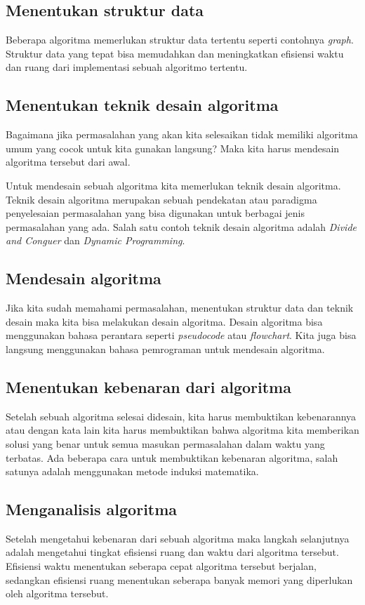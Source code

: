\subsection{Menentukan struktur data}
Beberapa algoritma memerlukan struktur data tertentu seperti contohnya \textit{graph}. Struktur data yang tepat bisa memudahkan dan meningkatkan efisiensi waktu dan ruang dari implementasi sebuah algoritmo tertentu. 

\subsection{Menentukan teknik desain algoritma}
Bagaimana jika permasalahan yang akan kita selesaikan tidak memiliki algoritma umum yang cocok untuk kita gunakan langsung? Maka kita harus mendesain algoritma tersebut dari awal. 

Untuk mendesain sebuah algoritma kita memerlukan teknik desain algoritma. Teknik desain algoritma merupakan sebuah pendekatan atau paradigma penyelesaian permasalahan yang bisa digunakan untuk berbagai jenis permasalahan yang ada. Salah satu contoh teknik desain algoritma adalah \textit{Divide and Conguer} dan \textit{Dynamic Programming}.

\subsection{Mendesain algoritma}
Jika kita sudah memahami permasalahan, menentukan struktur data dan teknik desain maka kita bisa melakukan desain algoritma. Desain algoritma bisa menggunakan bahasa perantara seperti \textit{pseudocode} atau \textit{flowchart}. Kita juga bisa langsung menggunakan bahasa pemrograman untuk mendesain algoritma. 

\subsection{Menentukan kebenaran dari algoritma}
Setelah sebuah algoritma selesai didesain, kita harus membuktikan kebenarannya atau dengan kata lain kita harus membuktikan bahwa algoritma kita memberikan solusi yang benar untuk semua masukan permasalahan dalam waktu yang terbatas. Ada beberapa cara untuk membuktikan kebenaran algoritma, salah satunya adalah menggunakan metode induksi matematika.

\subsection{Menganalisis algoritma}
Setelah mengetahui kebenaran dari sebuah algoritma maka langkah selanjutnya adalah mengetahui tingkat efisiensi ruang dan waktu dari algoritma tersebut. Efisiensi waktu menentukan seberapa cepat algoritma tersebut berjalan, sedangkan efisiensi ruang menentukan seberapa banyak memori yang diperlukan oleh algoritma tersebut. 

